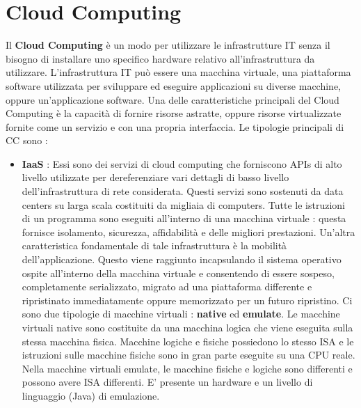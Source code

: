 \documentclass[12pt]{report}
\begin{document}
\chapter{Cloud Computing}
Il \textbf{Cloud Computing} è un modo per utilizzare le infrastrutture IT senza il bisogno di installare uno specifico hardware relativo all'infrastruttura da utilizzare. L'infrastruttura IT può essere una macchina virtuale, una piattaforma software utilizzata per sviluppare ed eseguire applicazioni su diverse macchine, oppure un'applicazione software. Una delle caratteristiche principali del Cloud Computing è la capacità di fornire risorse astratte, oppure risorse virtualizzate fornite come un servizio e con una propria interfaccia. Le tipologie principali di CC sono :
\begin{itemize}
\item \textbf{IaaS} : Essi sono dei servizi di cloud computing che forniscono APIs di alto livello utilizzate per dereferenziare vari dettagli di basso livello dell'infrastruttura di rete considerata. Questi servizi sono sostenuti da data centers su larga scala costituiti da migliaia di computers. Tutte le istruzioni di un programma sono eseguiti all'interno di una macchina virtuale : questa fornisce isolamento, sicurezza, affidabilità e delle migliori prestazioni. Un'altra caratteristica fondamentale di tale infrastruttura è la mobilità dell'applicazione. Questo viene raggiunto incapsulando il sistema operativo ospite all'interno della macchina virtuale e consentendo di essere sospeso, completamente serializzato, migrato ad una piattaforma differente e ripristinato immediatamente oppure memorizzato per un futuro ripristino. Ci sono due tipologie di macchine virtuali : \textbf{native} ed \textbf{emulate}. Le macchine virtuali native sono costituite da una macchina logica che viene eseguita sulla stessa macchina fisica. Macchine logiche e fisiche possiedono lo stesso ISA e le istruzioni sulle macchine fisiche sono in gran parte eseguite su una CPU reale. Nella macchine virtuali emulate, le macchine fisiche e logiche sono differenti e possono avere ISA differenti. E' presente un hardware e un livello di linguaggio (Java) di emulazione.

\end{itemize}
\end{document}

